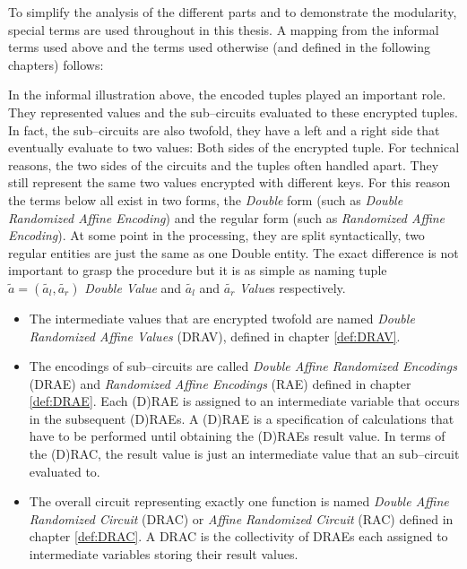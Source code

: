 To simplify the analysis of the different parts and to demonstrate the
modularity, special terms are used throughout in this thesis. A mapping from the
informal terms used above and the terms used otherwise (and defined in the
following chapters) follows:

In the informal illustration above, the encoded tuples played an important role.
They represented values and the sub--circuits evaluated to these encrypted
tuples. In fact, the sub--circuits are also twofold, they have a left and a
right side that eventually evaluate to two values: Both sides of the encrypted
tuple. For technical reasons, the two sides of the circuits and the tuples often
handled apart. They still represent the same two values encrypted with
different keys. For this reason the terms below all exist in two forms, the
\emph{Double} form (such as \emph{Double Randomized Affine Encoding}) and the
regular form (such as \emph{Randomized Affine Encoding}). At some point in the
processing, they are split syntactically, two regular entities are just the same
as one Double entity. The exact difference is not important to grasp the
procedure but it is as simple as naming tuple $\widetilde{a} = (\widetilde{a_l},
\widetilde{a_r})$ \emph{Double Value} and $\widetilde{a_l}$ and
$\widetilde{a_r}$ \emph{Value}s respectively.

\begin{itemize}

  \item The intermediate values that are encrypted twofold are named
    \emph{Double Randomized Affine Values} (DRAV), defined in chapter
    \ref{def:DRAV}.

  \item The encodings of sub--circuits are called \emph{Double Affine Randomized
    Encodings} (DRAE) and \emph{Randomized Affine Encodings} (RAE) defined in
    chapter \ref{def:DRAE}. Each (D)RAE is assigned to an intermediate variable
    that occurs in the subsequent (D)RAEs. A (D)RAE is a specification of
    calculations that have to be performed until obtaining the (D)RAEs result
    value. In terms of the (D)RAC, the result value is just an intermediate
    value that an sub--circuit evaluated to.

  \item The overall circuit representing exactly one function is named
    \emph{Double Affine Randomized Circuit} (DRAC) or \emph{Affine Randomized
    Circuit} (RAC) defined in chapter \ref{def:DRAC}. A DRAC is the collectivity
    of DRAEs each assigned to intermediate variables storing their result
    values.

\end{itemize}


